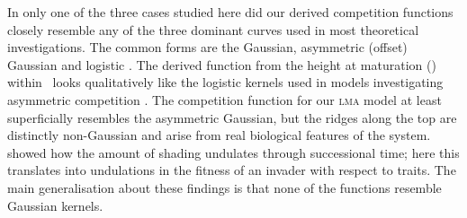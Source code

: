 \documentclass[a4paper,11pt]{article}
\begin{document}

In only one of the three cases studied here did our derived
competition functions closely resemble any of the three dominant
curves used in most theoretical investigations. The common forms are
the Gaussian, asymmetric (offset) Gaussian \citep{Roughgarden-1979}
and logistic \citep[e.g.][]{Kisdi-1999, Law-1997}.  The derived
function from the height at maturation (\hmat) within \plant\ looks
qualitatively like the logistic kernels used in models investigating
asymmetric competition \citep{Law-1997, Geritz-1999, Kisdi-1999,
  Calcagno-2006}.
 The competition function for our \textsc{lma} model
at least superficially resembles the asymmetric Gaussian, but the
ridges along the top are distinctly non-Gaussian and arise from real
biological features of the system.
%
\citet{Falster-2011} showed how the amount of shading undulates
through successional time; here this translates into undulations in
the fitness of an invader with respect to traits.
%
The main generalisation about these findings is that
none of the functions resemble Gaussian kernels.
\end{document}
